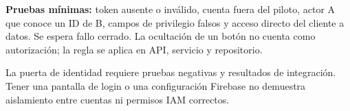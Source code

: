 \textbf{Pruebas mínimas:} token ausente o inválido, cuenta fuera del piloto, actor A que conoce un ID de B, campos de privilegio falsos y acceso directo del cliente a datos. Se espera fallo cerrado. La ocultación de un botón no cuenta como autorización; la regla se aplica en API, servicio y repositorio.

La puerta de identidad requiere pruebas negativas y resultados de integración. Tener una pantalla de login o una configuración Firebase no demuestra aislamiento entre cuentas ni permisos IAM correctos.
